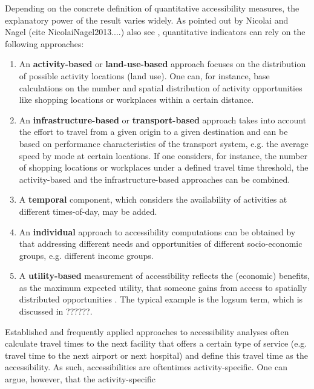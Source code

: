 Depending on the concrete definition of quantitative accessibility measures, the
explanatory power of the result varies widely.
%
%
As pointed out by Nicolai and Nagel (cite NicolaiNagel2013....) also see \citep[e.g.][]{GeursRitsema2001AccessibilityMeasures,Geurs2004AccessibilityReview}, quantitative indicators can rely on the following approaches:
%
\begin{enumerate}
\item An \textbf{activity-based} or \textbf{land-use-based} approach focuses on
the distribution of possible activity locations (land use). One can, for instance,
base calculations on the number and spatial distribution of activity opportunities
like shopping locations or workplaces within a certain distance.
%
\item An \textbf{in\-fra\-struc\-ture-based} or \textbf{transport-based} approach takes
into account the effort to travel from a given origin to a given destination and 
can be based on performance characteristics of the transport system, e.g. the
average speed by mode at certain locations. If one considers, for instance, the
number of shopping locations or workplaces under a defined travel time threshold,
the activity-based and the infrastructure-based approaches can be combined.
%
\item A \textbf{temporal} component, which considers the availability of activities
at different times-of-day, may be added.
%
\item An \textbf{individual} approach to accessibility computations can be
obtained by that addressing different needs and opportunities of different socio-economic groups, e.g. different income groups.
%
\item A \textbf{utility-based} measurement of accessibility reflects the
(economic) benefits, as the maximum expected utility, that someone gains
from access to spatially distributed opportunities
\citep{GeursRitsema2001AccessibilityMeasures,deJongEtAl2007LogsumTRA}. The
typical example is the logsum term, which is discussed in ??????.
\end{enumerate}
%
Established and frequently applied
approaches to accessibility analyses often calculate travel times to
the next facility that offers a certain type of service (e.g. travel time to the
next airport or next hospital) and define this travel time as the accessibility. As
such, accessibilities are oftentimes activity-specific.
One can argue, however, that the activity-specific
